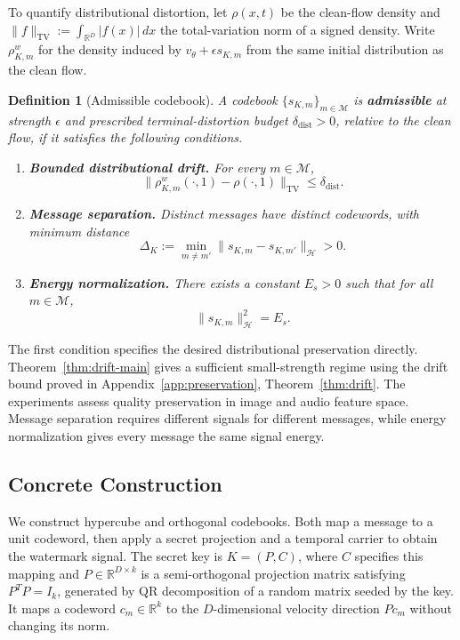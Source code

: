\documentclass[11pt]{article}
\newtheorem{definition}{Definition}
\newcommand{\TV}{\mathrm{TV}}
\begin{document}
To quantify distributional distortion, let $\rho(x,t)$ be the clean-flow
density and $\|f\|_{\TV}:=\int_{\mathbb R^D}|f(x)|\,dx$ the
total-variation norm of a signed density. Write $\rho^w_{K,m}$ for the
density induced by $v_\theta+\epsilon s_{K,m}$ from the same initial
distribution as the clean flow.

\begin{definition}[Admissible codebook]\label{def:admissible}
A codebook $\{s_{K,m}\}_{m\in\mathcal{M}}$ is \textbf{admissible}
at strength $\epsilon$ and prescribed terminal-distortion budget
$\delta_{\mathrm{dist}}>0$, relative to the clean flow, if it satisfies
the following conditions.
\begin{enumerate}
\item \textbf{Bounded distributional drift.} For every $m\in\mathcal M$,
\begin{equation}\label{eq:admissible-drift}
\bigl\|\rho^w_{K,m}(\cdot,1)-\rho(\cdot,1)\bigr\|_{\TV}
\le\delta_{\mathrm{dist}}.
\end{equation}
\item \textbf{Message separation.} Distinct messages have distinct
codewords, with minimum distance
\begin{equation}
\Delta_K:=\min_{m\ne m'}\|s_{K,m}-s_{K,m'}\|_{\mathcal H}>0.
\end{equation}
\item \textbf{Energy normalization.} There exists a constant $E_s > 0$
such that for all $m \in \mathcal{M}$,
\begin{equation}
\|s_{K,m}\|_{\mathcal H}^2 = E_s.
\end{equation}
\end{enumerate}
\end{definition}

The first condition specifies the desired distributional preservation
directly. Theorem~\ref{thm:drift-main} gives a sufficient small-strength
regime using the drift bound proved in Appendix~\ref{app:preservation},
Theorem~\ref{thm:drift}. The experiments assess quality preservation in
image and audio feature space. Message separation requires different
signals for different messages, while energy normalization gives every
message the same signal energy.

\subsection{Concrete Construction}\label{sec:concrete}

We construct hypercube and orthogonal codebooks. Both map a message to
a unit codeword, then apply a secret projection and a temporal carrier
to obtain the watermark signal.
The secret key is $K = (P, C)$, where $C$ specifies this mapping and
$P \in \mathbb{R}^{D \times k}$ is a semi-orthogonal projection matrix
satisfying $P^T P = I_k$, generated by QR decomposition of a random matrix
seeded by the key. It maps a codeword $c_m\in\mathbb R^k$ to the
$D$-dimensional velocity direction $Pc_m$ without changing its norm.
\end{document}
